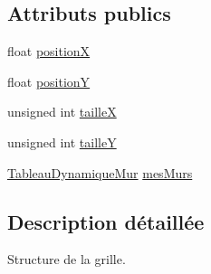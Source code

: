 \subsection*{Attributs publics}
\begin{DoxyCompactItemize}
\item 
float \hyperlink{structGrid_a1712b348175d1449f924218abc2c180b}{position\-X}
\item 
float \hyperlink{structGrid_aa084d4ec2894df907e02718c88ab4060}{position\-Y}
\item 
unsigned int \hyperlink{structGrid_ad6ec58066a6303fbc2aa5443840cf067}{taille\-X}
\item 
unsigned int \hyperlink{structGrid_adc12ffc8da211af2444db8a2007e5a7d}{taille\-Y}
\item 
\hyperlink{structTableauDynamiqueMur}{Tableau\-Dynamique\-Mur} \hyperlink{structGrid_a0462856a88311819d0422a08b9bb0033}{mes\-Murs}
\end{DoxyCompactItemize}


\subsection{Description détaillée}
Structure de la grille. 

